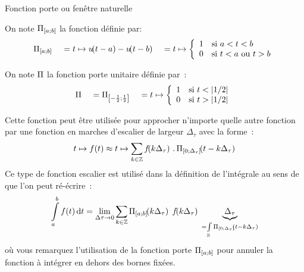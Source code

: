\begin{remark}{}
      \begin{definition}{Fonction porte ou fenêtre naturelle}

        On note $\Pi_{\left[a ; b\right]}$ la fonction définie par:
        \begin{equation}
          \label{eq:porte}
          \Pi_{\left[a ; b\right]} \;\;\;\;= t \mapsto u\!\!\left(t-a\right)-u\!\!\left(t-b\right) \;\;\;\;= t\mapsto \left\{\begin{array}{ll} {1} & {\text{si } a<t<b}\\ {0} & {\text{si } t<a \text{ ou } t>b}\\ \end{array}\right. 
        \end{equation}

        On note $\Pi$ la fonction porte unitaire définie par~:
\begin{equation}
          \label{eq:porte_unitaire}
          \Pi \;\;\;\;= \Pi_{\left[-\frac{1}{2} ; \frac{1}{2}\right]} \;\;\;\;= t\mapsto \left\{\begin{array}{ll} {1} & {\text{si } t<\left|1/2\right|}\\ {0} & {\text{si } t>\left|1/2\right|}\\ \end{array}\right. 
        \end{equation}   
      \end{definition}

      Cette fonction peut être utilisée pour approcher n'importe
      quelle autre fonction par une fonction en marches d'escalier de largeur $\Delta_\tau$ avec la forme~:
      \begin{equation}
        \label{eq:escalier}
        t\mapsto f(t)  \approx t\mapsto \sum_{k\in\mathbb{Z}} f\!\!\left(k\Delta_\tau\right)\,.\,\Pi_{\left[0 ; \Delta_\tau\right]}\!\!\left(t-k\Delta_\tau\right)
      \end{equation}
      Ce type de fonction escalier est utilisé dans la définition de
      l'intégrale au sens de  que l'on peut
      ré-écrire~:
      \begin{equation}
        \label{eq:integrale_escalier}
        \int\limits_{a}^{b}f(t)\,\mathrm{d{}} t = \lim_{\Delta\tau \to 0} \sum_{k\in\mathbb{Z}} \Pi_{\left[a ; b\right]}\!\!\left(k\Delta_\tau\right) \; f\!\!\left(k\Delta_\tau\right)\;\underbrace{\Delta_\tau}_{=\int\limits_{\mathbb{R}}\Pi_{\left[0 ; \Delta_\tau\right]}\!\!\left(t-k\Delta_\tau\right)}
      \end{equation}
      où vous remarquez l'utilisation de la fonction porte $\Pi_{\left[a ; b\right]}$ pour annuler la fonction à intégrer en dehors des bornes fixées.


\end{remark}
